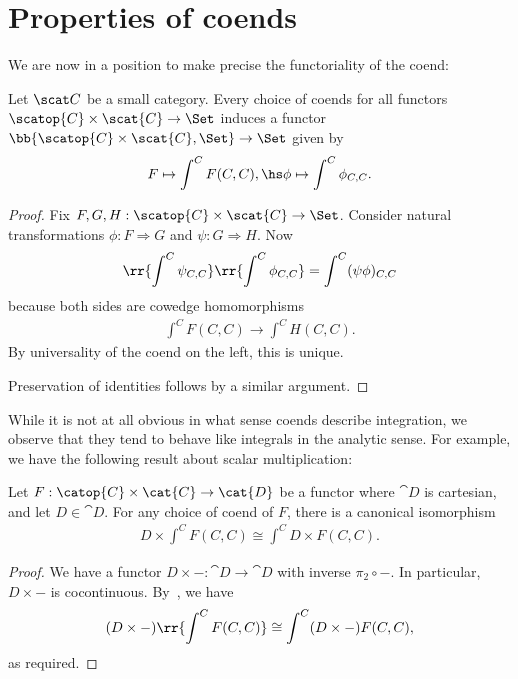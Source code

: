 \section{Properties of coends}

We are now in a position to make precise the functoriality of the coend:

\begin{lemma}\label{lemma:functoriality_of_coends}
  Let $\scat C$ be a small category.
  Every choice of coends for all functors $\scatop{C}\times\scat{C}\to\Set$ induces
  a functor $\bb{\scatop{C}\times\scat{C},\Set}\to\Set$ given by
  \begin{align*}
    F \mapsto \int^C F(C,C), \hs \phi \mapsto \int^C \phi_{C,C}.
  \end{align*}
  \begin{proof}
    Fix $F,G,H:\scatop{C}\times\scat{C}\to\Set$. Consider natural
    transformations $\phi:F\Rightarrow G$ and $\psi:G\Rightarrow H$. Now
    \begin{align*}
      \rr{\int^C \psi_{C,C}}\rr{\int^C \phi_{C,C}} = \int^C (\psi\phi)_{C,C}
    \end{align*}
    because both sides are cowedge homomorphisms
    \begin{align*}
      \int^C F(C,C) \to \int^C H(C,C).
    \end{align*}
    By universality of the coend on the left, this is unique.

    Preservation of identities follows by a similar argument.
  \end{proof}
\end{lemma}

While it is not at all obvious in what sense coends describe integration, we observe
that they tend to behave like integrals in the analytic sense. For example, we have the
following result about scalar multiplication:

\begin{lemma}\label{lemma:scalar_multiplication_of_coends}
  Let $F:\catop{C}\times\cat{C}\to\cat{D}$ be a functor where $\cat{D}$ is cartesian,
  and let $D\in\cat{D}$. For any choice of coend of $F$, there is a canonical isomorphism
  \begin{align*}
    D\times \int^{C} F(C,C) \cong \int^{C} D\times F(C,C).
  \end{align*}
  \begin{proof}
    We have a functor $D\times -:\cat{D}\to\cat{D}$ with inverse $\pi_2 \circ -$.
    In particular, $D\times -$ is cocontinuous. By~\cite[Theorem 1.2.7]{loregian2015},
    we have
    \begin{align*}
      (D\times -)\rr{\int^C F(C,C)} \cong \int^C (D\times -)F(C,C),
    \end{align*}
    as required.
  \end{proof}
\end{lemma}


